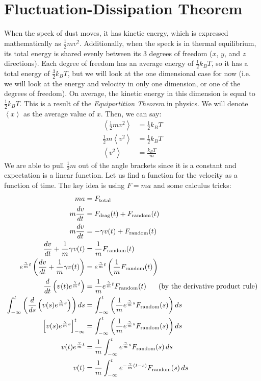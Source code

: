 \documentclass{article}
\begin{document}
\section{Fluctuation-Dissipation Theorem}
When the speck of dust moves, it has kinetic energy, which is expressed mathematically as $\frac{1}{2}mv^2$. Additionally, when the speck is in thermal equilibrium, its total energy is shared evenly between its 3 degrees of freedom ($x$, $y$, and $z$ directions). Each degree of freedom has an average energy of $\frac{1}{2}k_B T$, so it has a total energy of $\frac{3}{2}k_B T$, but we will look at the one dimensional case for now (i.e. we will look at the energy and velocity in only one dimension, or one of the degrees of freedom). On average, the kinetic energy in this dimension is equal to $\frac{1}{2}k_B T$. This is a result of the \textit{Equipartition Theorem} in physics. We will denote $\left<x\right>$ as the average value of $x$. Then, we can say:
\begin{align*}
    \left<\frac{1}{2}mv^2\right>&=\frac{1}{2}k_B T\\
    \frac{1}{2}m\left<v^2\right>&=\frac{1}{2}k_B T\\
    \left<v^2\right>&=\frac{k_B T}{m}
\end{align*}
We are able to pull $\frac{1}{2}m$ out of the angle brackets since it is a constant and expectation is a linear function. Let us find a function for the velocity as a function of time. The key idea is using $F=ma$ and some calculus tricks:
\begin{align*}
    ma &= F_{\text{total}}\\
    m\frac{dv}{dt} &= F_{\text{drag}}(t) + F_{\text{random}}(t)\\
    m\frac{dv}{dt} &= -\gamma v(t) + F_{\text{random}}(t)\\
    \frac{dv}{dt} + \frac{1}{m}\gamma v(t) &= \frac{1}{m} F_{\text{random}}(t)\\
    e^{\frac{\gamma}{m}t}\left(\frac{dv}{dt} + \frac{1}{m}\gamma v(t)\right) &= e^{\frac{\gamma}{m}t}\left(\frac{1}{m} F_{\text{random}}(t)\right)\\
    \frac{d}{dt}\left(v(t)e^{\frac{\gamma}{m}t}\right) &= \frac{1}{m} e^{\frac{\gamma}{m}t} F_{\text{random}}(t)\hspace{6mm}\text{(by the derivative product rule)}\\
    \int_{-\infty}^t \left(\frac{d}{ds}\left(v(s)e^{\frac{\gamma}{m}s}\right)\right)ds &= \int_{-\infty}^t \left(\frac{1}{m} e^{\frac{\gamma}{m}s} F_{\text{random}}(s)\right)ds\\
    \left[v(s)e^{\frac{\gamma}{m}s}\right]^t_{-\infty} &= \int_{-\infty}^t \left(\frac{1}{m} e^{\frac{\gamma}{m}s} F_{\text{random}}(s)\right)ds\\
    v(t)e^{\frac{\gamma}{m}t} &= \frac{1}{m}\int_{-\infty}^t e^{\frac{\gamma}{m}s} F_{\text{random}}(s)\,ds\\
    v(t) &= \frac{1}{m}\int_{-\infty}^t e^{-\frac{\gamma}{m}(t-s)} F_{\text{random}}(s)\,ds
\end{align*}
\end{document}
